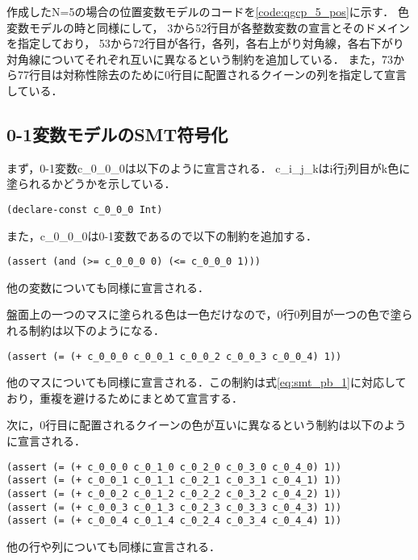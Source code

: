 作成したN=5の場合の位置変数モデルのコードを\ref{code:qgcp_5_pos}に示す．
色変数モデルの時と同様にして，
3から52行目が各整数変数の宣言とそのドメインを指定しており，
53から72行目が各行，各列，各右上がり対角線，各右下がり対角線についてそれぞれ互いに異なるという制約を追加している．
また，73から77行目は対称性除去のために0行目に配置されるクイーンの列を指定して宣言している．




\subsection{0-1変数モデルのSMT符号化}\label{sec:pro_pb}

%
%
まず，0-1変数c\_0\_0\_0は以下のように宣言される．
c\_i\_j\_kはi行j列目がk色に塗られるかどうかを示している．
{ \footnotesize \begin{verbatim}
(declare-const c_0_0_0 Int)
\end{verbatim}}
また，c\_0\_0\_0は0-1変数であるので以下の制約を追加する．
{ \footnotesize \begin{verbatim}
(assert (and (>= c_0_0_0 0) (<= c_0_0_0 1)))
\end{verbatim}}
他の変数についても同様に宣言される．

盤面上の一つのマスに塗られる色は一色だけなので，0行0列目が一つの色で塗られる制約は以下のようになる．
{ \footnotesize \begin{verbatim}
(assert (= (+ c_0_0_0 c_0_0_1 c_0_0_2 c_0_0_3 c_0_0_4) 1))
\end{verbatim}}
他のマスについても同様に宣言される．この制約は式\ref{eq:smt_pb_1}に対応しており，重複を避けるためにまとめて宣言する．

次に，0行目に配置されるクイーンの色が互いに異なるという制約は以下のように宣言される．
{ \footnotesize \begin{verbatim}
(assert (= (+ c_0_0_0 c_0_1_0 c_0_2_0 c_0_3_0 c_0_4_0) 1))
(assert (= (+ c_0_0_1 c_0_1_1 c_0_2_1 c_0_3_1 c_0_4_1) 1))
(assert (= (+ c_0_0_2 c_0_1_2 c_0_2_2 c_0_3_2 c_0_4_2) 1))
(assert (= (+ c_0_0_3 c_0_1_3 c_0_2_3 c_0_3_3 c_0_4_3) 1))
(assert (= (+ c_0_0_4 c_0_1_4 c_0_2_4 c_0_3_4 c_0_4_4) 1))
\end{verbatim}}
他の行や列についても同様に宣言される．

